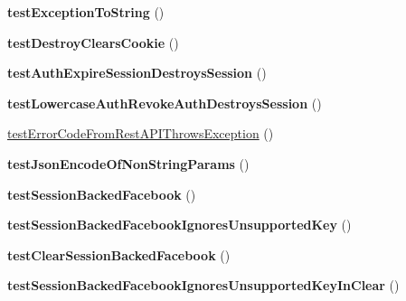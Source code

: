 \begin{DoxyCompactItemize}
\item 
\hypertarget{class_p_h_p_s_d_k_test_case_a865f3149d8be3557a7f63ccb6ee40a0d}{{\bfseries test\-Exception\-To\-String} ()}\label{class_p_h_p_s_d_k_test_case_a865f3149d8be3557a7f63ccb6ee40a0d}

\item 
\hypertarget{class_p_h_p_s_d_k_test_case_ad15630eefb683e2b1fe0f13b10bb1b9f}{{\bfseries test\-Destroy\-Clears\-Cookie} ()}\label{class_p_h_p_s_d_k_test_case_ad15630eefb683e2b1fe0f13b10bb1b9f}

\item 
\hypertarget{class_p_h_p_s_d_k_test_case_a86ab492771abe49e49b738fc5f31305d}{{\bfseries test\-Auth\-Expire\-Session\-Destroys\-Session} ()}\label{class_p_h_p_s_d_k_test_case_a86ab492771abe49e49b738fc5f31305d}

\item 
\hypertarget{class_p_h_p_s_d_k_test_case_a8ccb3b58cbcff3b97df97ffc9b70a456}{{\bfseries test\-Lowercase\-Auth\-Revoke\-Auth\-Destroys\-Session} ()}\label{class_p_h_p_s_d_k_test_case_a8ccb3b58cbcff3b97df97ffc9b70a456}

\item 
\hyperlink{class_p_h_p_s_d_k_test_case_a53f77053972568ef8fa3e2b9fe271599}{test\-Error\-Code\-From\-Rest\-A\-P\-I\-Throws\-Exception} ()
\item 
\hypertarget{class_p_h_p_s_d_k_test_case_a70a428f64336a4331078f73a743807d0}{{\bfseries test\-Json\-Encode\-Of\-Non\-String\-Params} ()}\label{class_p_h_p_s_d_k_test_case_a70a428f64336a4331078f73a743807d0}

\item 
\hypertarget{class_p_h_p_s_d_k_test_case_ad7caa1e8de74569d76db48763c0092e0}{{\bfseries test\-Session\-Backed\-Facebook} ()}\label{class_p_h_p_s_d_k_test_case_ad7caa1e8de74569d76db48763c0092e0}

\item 
\hypertarget{class_p_h_p_s_d_k_test_case_a3d9dd51f925c9bbfe10954ffb988baec}{{\bfseries test\-Session\-Backed\-Facebook\-Ignores\-Unsupported\-Key} ()}\label{class_p_h_p_s_d_k_test_case_a3d9dd51f925c9bbfe10954ffb988baec}

\item 
\hypertarget{class_p_h_p_s_d_k_test_case_ab7ba67a1f1644901661f273521dd0157}{{\bfseries test\-Clear\-Session\-Backed\-Facebook} ()}\label{class_p_h_p_s_d_k_test_case_ab7ba67a1f1644901661f273521dd0157}

\item 
\hypertarget{class_p_h_p_s_d_k_test_case_a349ec9f1da31579e1a511b4fbe8dc528}{{\bfseries test\-Session\-Backed\-Facebook\-Ignores\-Unsupported\-Key\-In\-Clear} ()}\label{class_p_h_p_s_d_k_test_case_a349ec9f1da31579e1a511b4fbe8dc528}


\end{DoxyCompactItemize}
